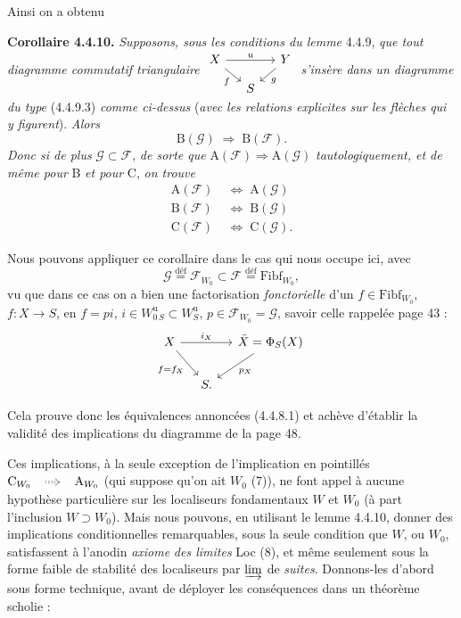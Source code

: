 \documentclass[11pt]{article}
\newcommand{\printedpage}[1]{\marginpar{\footnotesize p.~#1}}
\newcommand{\msp}[1]{\marginpar{\footnotesize [#1]}}
\newcommand{\Fibf}{\mathrm{Fibf}}
\newcommand{\dottedimpl}{\mathrel{\begin{tikzcd}[ampersand replacement=\&, column sep=small, baseline=-0.5ex]{}\arrow[r,Rightarrow,dotted]\&{}\end{tikzcd}}}
\begin{document}
Ainsi on a obtenu

\textbf{Corollaire 4.4.10.} \textit{Supposons, sous les conditions du lemme} 4.4.9, \textit{que tout diagramme commutatif triangulaire} $\begin{tikzcd}[column sep=small, row sep=small, ampersand replacement=\&]
X \arrow[rr, "u"] \arrow[dr, "f"'] \& \& Y \arrow[dl, "g"] \\
\& S \&
\end{tikzcd}$ \textit{s'insère dans un diagramme du type} (4.4.9.3) \textit{comme ci-dessus} (\textit{avec les relations explicites sur les flèches qui y figurent}). \textit{Alors}
\[
\mathrm{B}(\mathcal{G}) \;\Longrightarrow\; \mathrm{B}(\mathcal{F}).
\]
\textit{Donc si de plus} $\mathcal{G} \subset \mathcal{F}$, \textit{de sorte que} $\mathrm{A}(\mathcal{F}) \Longrightarrow \mathrm{A}(\mathcal{G})$ \textit{tautologiquement, et de même pour} B \textit{et pour} C, \textit{on trouve}
\[
\begin{aligned}
\mathrm{A}(\mathcal{F}) &\;\Longleftrightarrow\; \mathrm{A}(\mathcal{G})\\
\mathrm{B}(\mathcal{F}) &\;\Longleftrightarrow\; \mathrm{B}(\mathcal{G})\\
\mathrm{C}(\mathcal{F}) &\;\Longleftrightarrow\; \mathrm{C}(\mathcal{G}).
\end{aligned}
\]

Nous pouvons appliquer ce corollaire dans le cas qui nous occupe ici, avec
\[
\mathcal{G} \overset{\text{déf}}{=} \mathcal{F}_{W_0} \subset \mathcal{F} \overset{\text{déf}}{=} \Fibf_{W_0},
\]
\printedpage{32}
\msp{page 55}
vu que dans ce cas on a bien une factorisation \textit{fonctorielle} d'un $f \in \Fibf_{W_0}$, $f : X \longrightarrow S$, en $f = pi$, $i \in W^{\mathrm{u}}_{0\,S} \subset W^{\mathrm{u}}_S$, $p \in \mathcal{F}_{W_0} = \mathcal{G}$, savoir celle rappelée page 43 :
\[
\begin{tikzcd}[column sep=small]
X \arrow[rr, "i_X"] \arrow[dr, "f=f_X"'] & & \bar{X} = \Phi_S(X) \arrow[dl, "p_X"] \\
& S. &
\end{tikzcd}
\]

Cela prouve donc les équivalences annoncées (4.4.8.1) et achève d'établir la validité des implications du diagramme de la page 48.

Ces implications, à la seule exception de l'implication en pointillés $\mathrm{C}_{W_0} \dottedimpl \mathrm{A}_{W_0}$ (qui suppose qu'on ait $W_0$ (7)), ne font appel à aucune hypothèse particulière sur les localiseurs fondamentaux $W$ et $W_0$ (à part l'inclusion $W \supset W_0$). Mais nous pouvons, en utilisant le lemme 4.4.10, donner des implications conditionnelles remarquables, sous la seule condition que $W$, ou $W_0$, satisfassent à l'anodin \textit{axiome}
\msp{page 56}
\textit{des limites} Loc (8), et même seulement sous la forme faible de stabilité des localiseurs par $\varinjlim$ de \textit{suites}. Donnons-les d'abord sous forme technique, avant de déployer les conséquences dans un théorème scholie :
\end{document}
